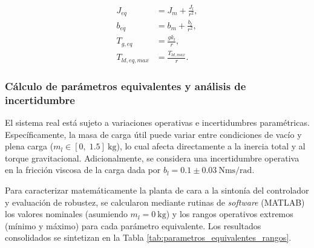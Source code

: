 \documentclass[10pt,a4paper]{article}
\begin{document}
\begin{equation*}
    \begin{aligned}
        J_{eq} &= J_m + \frac{J_l}{r^2}, \\
        b_{eq} &= b_m + \frac{b_l}{r^2}, \\
        T_{g,eq} &= \frac{g k_l}{r}, \\
        T_{ld,eq,max} &= \frac{T_{ld,max}}{r}.
    \end{aligned}
\end{equation*}

\subsubsection{Cálculo de parámetros equivalentes y análisis de incertidumbre}

El sistema real está sujeto a variaciones operativas e incertidumbres paramétricas. 
Específicamente, la masa de carga útil puede variar entre condiciones de vacío y plena carga ($m_l \in [0,\;1.5]\ \si{\kilogram}$), 
lo cual afecta directamente a la inercia total y al torque gravitacional. 
Adicionalmente, se considera una incertidumbre operativa en la fricción viscosa de la carga dada por $b_l = 0.1 \pm 0.03\ \si{\newton\meter\second\per\radian}$.

Para caracterizar matemáticamente la planta de cara a la sintonía del controlador y evaluación de robustez, se calcularon mediante rutinas de \textit{software} (MATLAB) los valores nominales (asumiendo $m_l = \SI{0}{\kilogram}$) y los rangos operativos extremos (mínimo y máximo) para cada parámetro equivalente. 
Los resultados consolidados se sintetizan en la Tabla \ref{tab:parametros_equivalentes_rangos}.
\end{document}

